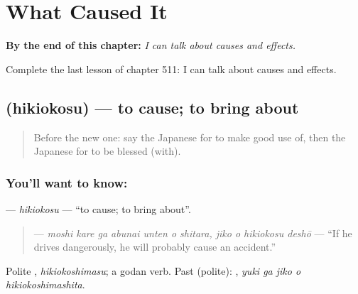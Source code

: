 
\chapter{What Caused It}
\label{ch:ja-what-caused-it}

\begin{chapteropening}
\textbf{By the end of this chapter:} \emph{I can talk about causes and effects.}

Complete the last lesson of chapter 511: I can talk about causes and effects.
\end{chapteropening}

\section[\texorpdfstring{\ja{ひきおこす} (hikiokosu)}{ひきおこす (hikiokosu)}]{ (hikiokosu) — to cause; to bring about}

\label{lesson:JA-C511-hikiokosu}



\begin{quote}
Before the new one: say the Japanese for to make good use of, then the Japanese for to be blessed (with).
\end{quote}

\subsection*{You'll want to know: }
\textbf{} — \emph{hikiokosu} — \textquotedblleft{}to cause; to bring about\textquotedblright{}.

\begin{quote}
\textbf{     } — \emph{moshi kare ga abunai unten o shitara, jiko o hikiokosu deshō} — \textquotedblleft{}If he drives dangerously, he will probably cause an accident.\textquotedblright{}
\end{quote}

Polite \textbf{}, \emph{hikiokoshimasu}; a godan verb. Past (polite): \textbf{  }, \emph{yuki ga jiko o hikiokoshimashita}.

